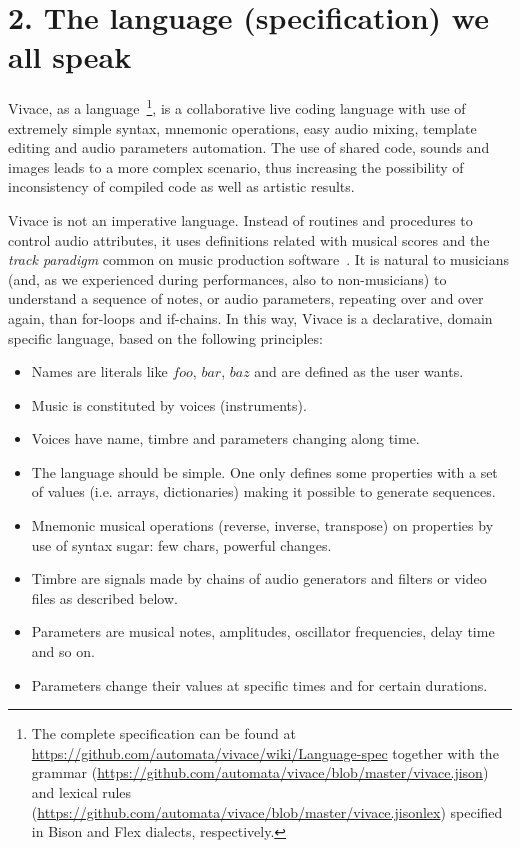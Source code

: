 \documentclass[12pt,times,twocolumn]{article}
\begin{document}
\section{2. The language (specification) we all speak}

Vivace, as a language~\footnote{The complete specification can be
  found at
  \url{https://github.com/automata/vivace/wiki/Language-spec} together with the
  grammar (\url{https://github.com/automata/vivace/blob/master/vivace.jison})
  and lexical rules
  (\url{https://github.com/automata/vivace/blob/master/vivace.jisonlex}) specified in Bison and Flex dialects,
  respectively.}, is a
collaborative live coding language with use of extremely simple
syntax, mnemonic operations, easy audio mixing, template editing and
audio parameters automation. The use of shared code, sounds and images
leads to a more complex scenario, thus increasing the possibility of
inconsistency of compiled code as well as artistic
results.

Vivace is not an imperative language. Instead of routines and
procedures to control audio attributes, it uses definitions related
with musical scores and the \emph{track paradigm} common on music
production software~\cite{collins2011live}. It is natural to musicians (and, as we
experienced during performances, also to non-musicians) to understand
a sequence of notes, or audio parameters, repeating over and over
again, than for-loops and if-chains. In this way, Vivace is a
declarative, domain specific language, based on the following
principles:

\begin{itemize}
	\item Names are literals like $foo$, $bar$, $baz$ and are defined as
	  the user wants.
	\item Music is constituted by voices (instruments).
	\item Voices have name, timbre and parameters changing along time.
	\item The language should be simple. One only defines some properties with a set of
	  values (i.e. arrays, dictionaries) making it possible to generate
	  sequences.
	\item Mnemonic musical operations (reverse, inverse, transpose) on
	  properties by use of syntax sugar: few chars, powerful changes.
	\item Timbre are signals made by chains of audio generators and
	  filters or video files as described below.
	\item Parameters are musical notes, amplitudes, oscillator
	  frequencies, delay time and so on.
	\item Parameters change their values at specific times and for certain
  durations.
\end{itemize}
\end{document}

